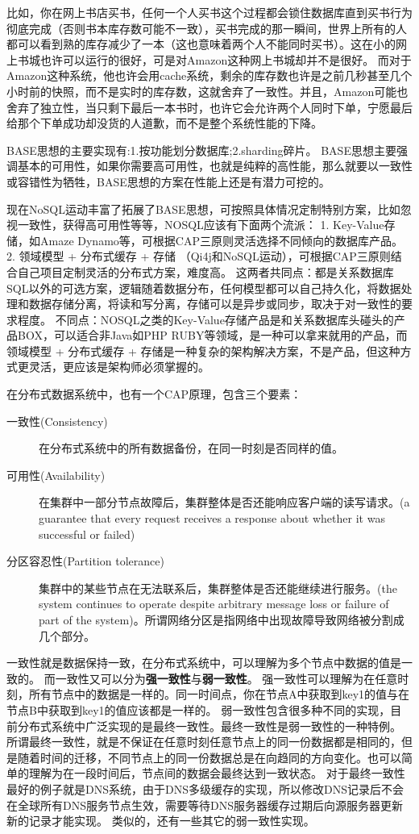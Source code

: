 比如，你在网上书店买书，任何一个人买书这个过程都会锁住数据库直到买书行为彻底完成（否则书本库存数可能不一致），买书完成的那一瞬间，世界上所有的人都可以看到熟的库存减少了一本（这也意味着两个人不能同时买书）。这在小的网上书城也许可以运行的很好，可是对Amazon这种网上书城却并不是很好。
而对于Amazon这种系统，他也许会用cache系统，剩余的库存数也许是之前几秒甚至几个小时前的快照，而不是实时的库存数，这就舍弃了一致性。并且，Amazon可能也舍弃了独立性，当只剩下最后一本书时，也许它会允许两个人同时下单，宁愿最后给那个下单成功却没货的人道歉，而不是整个系统性能的下降。

BASE思想的主要实现有:1.按功能划分数据库;2.sharding碎片。
BASE思想主要强调基本的可用性，如果你需要高可用性，也就是纯粹的高性能，那么就要以一致性或容错性为牺牲，BASE思想的方案在性能上还是有潜力可挖的。

现在NoSQL运动丰富了拓展了BASE思想，可按照具体情况定制特别方案，比如忽视一致性，获得高可用性等等，NOSQL应该有下面两个流派：
1. Key-Value存储，如Amaze Dynamo等，可根据CAP三原则灵活选择不同倾向的数据库产品。
2. 领域模型 + 分布式缓存 + 存储 （Qi4j和NoSQL运动），可根据CAP三原则结合自己项目定制灵活的分布式方案，难度高。
这两者共同点：都是关系数据库SQL以外的可选方案，逻辑随着数据分布，任何模型都可以自己持久化，将数据处理和数据存储分离，将读和写分离，存储可以是异步或同步，取决于对一致性的要求程度。
不同点：NOSQL之类的Key-Value存储产品是和关系数据库头碰头的产品BOX，可以适合非Java如PHP RUBY等领域，是一种可以拿来就用的产品，而领域模型 + 分布式缓存 + 存储是一种复杂的架构解决方案，不是产品，但这种方式更灵活，更应该是架构师必须掌握的。


在分布式数据系统中，也有一个CAP原理，包含三个要素：
\begin{description}
\item [一致性(Consistency)]在分布式系统中的所有数据备份，在同一时刻是否同样的值。
\item [可用性(Availability)]在集群中一部分节点故障后，集群整体是否还能响应客户端的读写请求。(a guarantee that every request receives a response about whether it was successful or failed)
\item [分区容忍性(Partition tolerance)]集群中的某些节点在无法联系后，集群整体是否还能继续进行服务。(the system continues to operate despite arbitrary message loss or failure of part of the system)。所谓网络分区是指网络中出现故障导致网络被分割成几个部分。
\end{description}

一致性就是数据保持一致，在分布式系统中，可以理解为多个节点中数据的值是一致的。
而一致性又可以分为\textbf{强一致性}与\textbf{弱一致性}。
强一致性可以理解为在任意时刻，所有节点中的数据是一样的。同一时间点，你在节点A中获取到key1的值与在节点B中获取到key1的值应该都是一样的。
弱一致性包含很多种不同的实现，目前分布式系统中广泛实现的是最终一致性。最终一致性是弱一致性的一种特例。
所谓最终一致性，就是不保证在任意时刻任意节点上的同一份数据都是相同的，但是随着时间的迁移，不同节点上的同一份数据总是在向趋同的方向变化。也可以简单的理解为在一段时间后，节点间的数据会最终达到一致状态。
对于最终一致性最好的例子就是DNS系统，由于DNS多级缓存的实现，所以修改DNS记录后不会在全球所有DNS服务节点生效，需要等待DNS服务器缓存过期后向源服务器更新新的记录才能实现。
类似的，还有一些其它的弱一致性实现。

